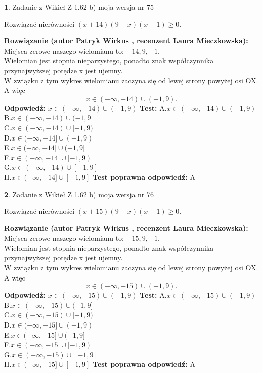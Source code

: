 \documentclass[12pt, a4paper]{article}
\theoremstyle{definition} %
\newtheorem{zad}{}
\newcommand{\zadStart}[1]{\begin{zad}#1\newline}
\newcommand{\zadStop}{\end{zad}}
\newcommand{\rozwStart}[2]{\noindent \textbf{Rozwiązanie (autor #1 , recenzent #2): }\newline}
\newcommand{\rozwStop}{\newline}
\newcommand{\odpStart}{\noindent \textbf{Odpowiedź:}\newline}
\newcommand{\odpStop}{\newline}
\newcommand{\testStart}{\noindent \textbf{Test:}\newline}
\newcommand{\testStop}{\newline}
\newcommand{\kluczStart}{\noindent \textbf{Test poprawna odpowiedź:}\newline}
\newcommand{\kluczStop}{\newline}
\begin{document}
\zadStart{Zadanie z Wikieł Z 1.62 b) moja wersja nr 75}

Rozwiązać nierówności $(x+14)(9-x)(x+1)\ge0$.
\zadStop
\rozwStart{Patryk Wirkus}{Laura Mieczkowska}
Miejsca zerowe naszego wielomianu to: $-14, 9, -1$.\\
Wielomian jest stopnia nieparzystego, ponadto znak współczynnika przy\linebreak najwyższej potędze x jest ujemny.\\ W związku z tym wykres wielomianu zaczyna się od lewej strony powyżej osi OX. A więc $$x \in (-\infty,-14) \cup (-1,9).$$
\rozwStop
\odpStart
$x \in (-\infty,-14) \cup (-1,9)$
\odpStop
\testStart
A.$x \in (-\infty,-14) \cup (-1,9)$\\
B.$x \in (-\infty,-14) \cup (-1,9]$\\
C.$x \in (-\infty,-14) \cup [-1,9)$\\
D.$x \in (-\infty,-14] \cup (-1,9)$\\
E.$x \in (-\infty,-14] \cup (-1,9]$\\
F.$x \in (-\infty,-14] \cup [-1,9)$\\
G.$x \in (-\infty,-14) \cup [-1,9]$\\
H.$x \in (-\infty,-14] \cup [-1,9]$
\testStop
\kluczStart
A
\kluczStop



\zadStart{Zadanie z Wikieł Z 1.62 b) moja wersja nr 76}

Rozwiązać nierówności $(x+15)(9-x)(x+1)\ge0$.
\zadStop
\rozwStart{Patryk Wirkus}{Laura Mieczkowska}
Miejsca zerowe naszego wielomianu to: $-15, 9, -1$.\\
Wielomian jest stopnia nieparzystego, ponadto znak współczynnika przy\linebreak najwyższej potędze x jest ujemny.\\ W związku z tym wykres wielomianu zaczyna się od lewej strony powyżej osi OX. A więc $$x \in (-\infty,-15) \cup (-1,9).$$
\rozwStop
\odpStart
$x \in (-\infty,-15) \cup (-1,9)$
\odpStop
\testStart
A.$x \in (-\infty,-15) \cup (-1,9)$\\
B.$x \in (-\infty,-15) \cup (-1,9]$\\
C.$x \in (-\infty,-15) \cup [-1,9)$\\
D.$x \in (-\infty,-15] \cup (-1,9)$\\
E.$x \in (-\infty,-15] \cup (-1,9]$\\
F.$x \in (-\infty,-15] \cup [-1,9)$\\
G.$x \in (-\infty,-15) \cup [-1,9]$\\
H.$x \in (-\infty,-15] \cup [-1,9]$
\testStop
\kluczStart
A
\kluczStop
\end{document}
